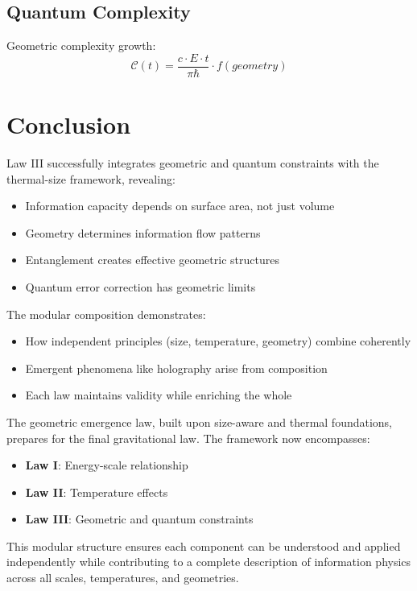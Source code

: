 \documentclass[11pt,a4paper]{article}
\theoremstyle{definition}
\begin{document}
\subsection{Quantum Complexity}

Geometric complexity growth:
\begin{equation}
\mathcal{C}(t) = \frac{c \cdot E \cdot t}{\pi \hbar} \cdot f(geometry)
\end{equation}

\section{Conclusion}

Law III successfully integrates geometric and quantum constraints with the thermal-size framework, revealing:

\begin{itemize}
\item Information capacity depends on surface area, not just volume
\item Geometry determines information flow patterns
\item Entanglement creates effective geometric structures
\item Quantum error correction has geometric limits
\end{itemize}

The modular composition demonstrates:
\begin{itemize}
\item How independent principles (size, temperature, geometry) combine coherently
\item Emergent phenomena like holography arise from composition
\item Each law maintains validity while enriching the whole
\end{itemize}

The geometric emergence law, built upon size-aware and thermal foundations, prepares for the final gravitational law. The framework now encompasses:
\begin{itemize}
\item \textbf{Law I}: Energy-scale relationship
\item \textbf{Law II}: Temperature effects
\item \textbf{Law III}: Geometric and quantum constraints
\end{itemize}

This modular structure ensures each component can be understood and applied independently while contributing to a complete description of information physics across all scales, temperatures, and geometries.
\end{document}
